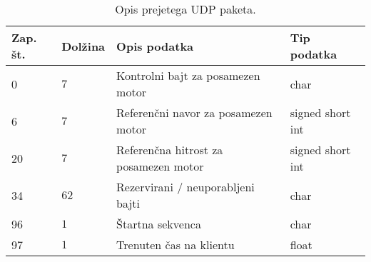 
\begin{table}[h]
	\centering
	\begin{footnotesize}
		\begin{tabular}{|l l l l|}
		Zap. \v{s}t. &  Dol\v{z}ina & Opis podatka & Tip podatka\\ \hline
		0 & $7$ & Kontrolni bajt za posamezen motor & char \\
		6 & $7$ & Referen\v{c}ni navor za posamezen motor & signed short int \\
		20 & $7$ & Referen\v{c}na hitrost za posamezen motor & signed short int \\
		34 &$62$ & Rezervirani / neuporabljeni bajti & char \\
		96 & $1$ & \v{S}tartna sekvenca & char\\
		97 & $1$ & Trenuten \v{c}as na klientu & float\\ \hline
		\end{tabular}
	\end{footnotesize}
	\caption{Opis prejetega UDP paketa.}
	\label{table:udp-command}
\end{table}